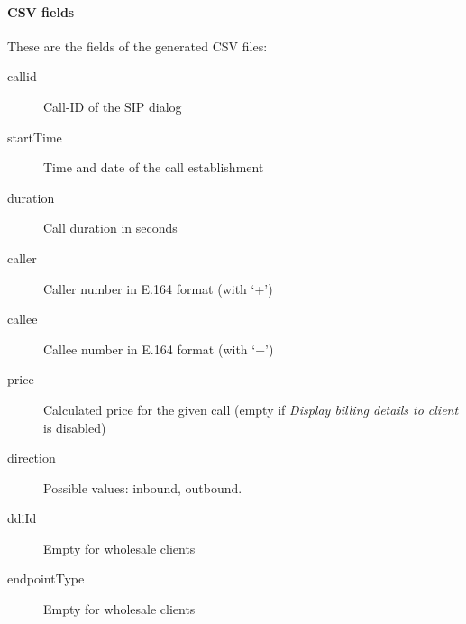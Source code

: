 \documentclass[letterpaper,10pt,english]{sphinxmanual}
\begin{document}
\paragraph{CSV fields}
\label{administration_portal/client/wholesale/calls/call_csv_schedulers:csv-fields}
These are the fields of the generated CSV files:
\begin{description}
\item[{callid}] \leavevmode{}\label{administration_portal/client/wholesale/calls/call_csv_schedulers:term-callid}
Call-ID of the SIP dialog

\item[{startTime}] \leavevmode{}\label{administration_portal/client/wholesale/calls/call_csv_schedulers:term-starttime}
Time and date of the call establishment

\item[{duration}] \leavevmode{}\label{administration_portal/client/wholesale/calls/call_csv_schedulers:term-duration}
Call duration in seconds

\item[{caller}] \leavevmode{}\label{administration_portal/client/wholesale/calls/call_csv_schedulers:term-caller}
Caller number in E.164 format (with `+')

\item[{callee}] \leavevmode{}\label{administration_portal/client/wholesale/calls/call_csv_schedulers:term-callee}
Callee number in E.164 format (with `+')

\item[{price}] \leavevmode{}\label{administration_portal/client/wholesale/calls/call_csv_schedulers:term-price}
Calculated price for the given call (empty if \emph{Display billing details to client} is disabled)

\item[{direction}] \leavevmode{}\label{administration_portal/client/wholesale/calls/call_csv_schedulers:term-12}
Possible values: inbound, outbound.

\item[{ddiId}] \leavevmode{}\label{administration_portal/client/wholesale/calls/call_csv_schedulers:term-ddiid}
Empty for wholesale clients

\item[{endpointType}] \leavevmode{}\label{administration_portal/client/wholesale/calls/call_csv_schedulers:term-endpointtype}
Empty for wholesale clients


\end{description}
\end{document}
